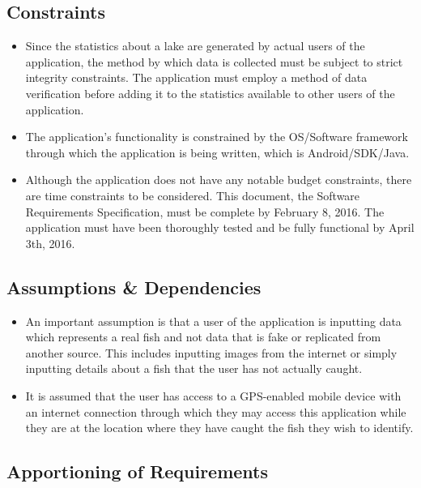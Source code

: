 \documentclass{article}
\begin{document}
\subsection{Constraints}
\begin{itemize}
	\item
	Since the statistics about a lake are generated by actual users of the application, the method by which data is collected must be subject to strict integrity constraints. The application must employ a method of data verification before adding it to the statistics available to other users of the application. 

	\item
	The application's functionality is constrained by the OS/Software framework through which the application is being written, which is Android/SDK/Java.

	\item
	Although the application does not have any notable budget constraints, there are time constraints to be considered. This document, the Software Requirements Specification, must be complete by February 8, 2016. The application must have been thoroughly tested and be fully functional by April 3th, 2016.
\end{itemize}

\subsection{Assumptions \& Dependencies}
\begin{itemize}
	\item
	An important assumption is that a user of the application is inputting data which represents a real fish and not data that is fake or replicated from another source. This includes inputting images from the internet or simply inputting details about a fish that the user has not actually caught.
	
	\item
	It is assumed that the user has access to a GPS-enabled mobile device with an internet connection through which they may access this application while they are at the location where they have caught the fish they wish to identify.
\end{itemize}

\subsection{Apportioning of Requirements}

\iffalse
There are currently no requirements that will delayed until the future.
\fi
\end{document}

